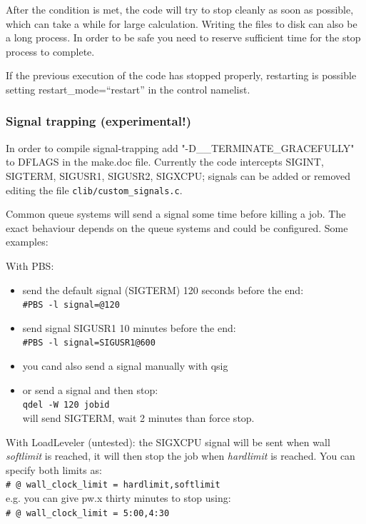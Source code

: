 \documentclass[12pt,a4paper]{article}
\begin{document}
After the condition is met, the code will try to stop cleanly as soon as possible, which can take a while for large calculation. Writing the files to disk can also be a long process. In order to be safe you need to reserve sufficient time for the stop process to complete.

If the previous execution of the code has stopped properly, restarting is possible setting restart\_mode=``restart'' in the control namelist.

\subsubsection{Signal trapping (experimental!)}
In order to compile signal-trapping add \mbox{"-D\_\_TERMINATE\_GRACEFULLY"} to \mbox{DFLAGS} in the make.doc file. Currently the code intercepts \mbox{SIGINT}, \mbox{SIGTERM}, \mbox{SIGUSR1}, \mbox{SIGUSR2}, \mbox{SIGXCPU}; signals can be added or removed editing the file {\tt clib/custom\_signals.c}.

Common queue systems will send a signal some time before killing a job. The exact behaviour depends on the queue systems and could be configured. Some examples:
  
With PBS:
\begin{itemize}
  \item send the default signal (\mbox{SIGTERM}) 120 seconds before the end:\\
  {\tt \#PBS -l signal=@120}

  \item send signal SIGUSR1 10 minutes before the end:\\
  {\tt \#PBS -l signal=SIGUSR1@600}

  \item you cand also send a signal manually with qsig
  \item or send a signal and then stop:\\
   {\tt qdel -W 120 jobid}\\
  will send SIGTERM, wait 2 minutes than force stop.
\end{itemize}

With LoadLeveler (untested): the \mbox{SIGXCPU} signal will be sent when wall \emph{softlimit} is reached, it will then stop the job when \emph{hardlimit} is reached. You can specify both limits as:\\
  {\tt \# @ wall\_clock\_limit = hardlimit,softlimit}\\
    e.g. you can give pw.x thirty minutes to stop using:\\
  {\tt \# @ wall\_clock\_limit = 5:00,4:30}\\
\end{document}
